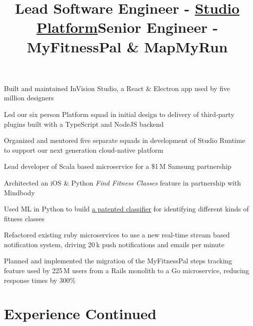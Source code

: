 \documentclass[12pt, tweaklist, line]{res}
\let\tempone\itemize
\let\temptwo\enditemize
\renewenvironment{itemize}{\tempone\vspace{-.15in}\setlength{\topsep}{0pt}\setlength{\itemsep}{3pt}\vspace{-.15in}}{\temptwo}
\begin{document}
\begin{resume}
\title{Lead Software Engineer - \href{https://www.invisionapp.com/studio}{Studio Platform}}
\begin{position}
\begin{itemize}
\item Built and maintained InVision Studio, a React \& Electron app used by five million designers
\item Led our six person Platform squad in initial design to delivery of third-party plugins built with a TypeScript and NodeJS backend
\item Organized and mentored five separate squads in development of Studio Runtime to support our next generation cloud-native platform
\end{itemize}
\end{position}

\title{Senior Engineer - MyFitnessPal \& MapMyRun}
\begin{position}
\begin{itemize}
\item Lead developer of Scala based microservice for a \$1\,M Samsung partnership
\item Architected an iOS \& Python \textit{Find Fitness Classes} feature in partnership with Mindbody
\item Used ML in Python to build \href{https://patents.google.com/patent/US20180225367A1/en?oq=20180225367}{a patented classifier} for identifying different kinds of fitness classes
\item Refactored existing ruby microservices to use a new real-time stream based notification system, driving 20\,k push notifications and emails per minute
\item Planned and implemented the migration of the MyFitnessPal steps tracking feature used by 225\,M users from a Rails monolith to a Go microservice, reducing response times by 300\%
\end{itemize}
\end{position}


\pagebreak


\vspace{-.17in}
\vtop{\hspace{-.55in} \hsize=6.9in \hrulefill}
\section{Experience Continued}


\end{resume}
\end{document}
